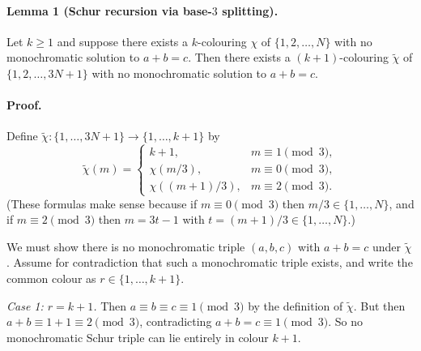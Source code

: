 \paragraph{Lemma 1 (Schur recursion via base-$3$ splitting).}
Let $k\ge 1$ and suppose there exists a $k$-colouring $\chi$ of $\{1,2,\dots,N\}$ with no monochromatic solution to $a+b=c$.
Then there exists a $(k+1)$-colouring $\widetilde\chi$ of $\{1,2,\dots,3N+1\}$ with no monochromatic solution to $a+b=c$.

\paragraph{Proof.}
Define $\widetilde\chi:\{1,\dots,3N+1\}\to\{1,\dots,k+1\}$ by
\[
\widetilde\chi(m)=
\begin{cases}
 k+1, & m\equiv 1\pmod 3,\\
 \chi(m/3), & m\equiv 0\pmod 3,\\
 \chi((m+1)/3), & m\equiv 2\pmod 3.
\end{cases}
\]
(These formulas make sense because if $m\equiv 0\pmod 3$ then $m/3\in\{1,\dots,N\}$, and if $m\equiv 2\pmod 3$ then $m=3t-1$ with $t=(m+1)/3\in\{1,\dots,N\}$.)

We must show there is no monochromatic triple $(a,b,c)$ with $a+b=c$ under $\widetilde\chi$.
Assume for contradiction that such a monochromatic triple exists, and write the common colour as $r\in\{1,\dots,k+1\}$.

\emph{Case 1: $r=k+1$.}
Then $a\equiv b\equiv c\equiv 1\pmod 3$ by the definition of $\widetilde\chi$.
But then $a+b\equiv 1+1\equiv 2\pmod 3$, contradicting $a+b=c\equiv 1\pmod 3$.
So no monochromatic Schur triple can lie entirely in colour $k+1$.

